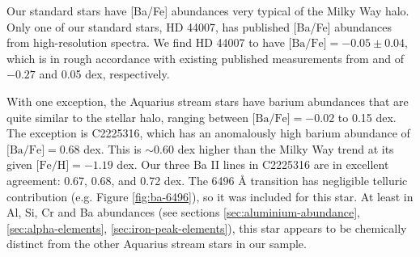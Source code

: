 \documentclass{emulateapj}
\begin{document}
Our standard stars have [Ba/Fe] abundances very typical of the Milky Way halo. Only one of our standard stars, HD 44007, has published [Ba/Fe] abundances from high-resolution spectra. We find HD 44007 to have $\mbox{[Ba/Fe]} = -0.05 \pm 0.04$, which is in rough accordance with existing published measurements from \citet{fulbright_2000} and \citet{burris;et-al_2000} of $-0.27$ and 0.05 dex, respectively. 

With one exception, the Aquarius stream stars have barium abundances that are quite similar to the stellar halo, ranging between $\mbox{[Ba/Fe]} = -0.02$ to 0.15 dex. The exception is C2225316, which has an anomalously high barium abundance of $\mbox{[Ba/Fe]} = 0.68$ dex. This is $\sim{}0.60$ dex higher than the Milky Way trend at its given $\mbox{[Fe/H]} = -1.19$ dex. Our three Ba \textsc{II} lines in C2225316 are in excellent agreement: 0.67, 0.68, and 0.72 dex. The 6496 {\AA} transition has negligible telluric contribution (e.g. Figure \ref{fig:ba-6496}), so it was included for this star. At least in Al, Si, Cr and Ba abundances (see sections \ref{sec:aluminium-abundance}, \ref{sec:alpha-elements}, \ref{sec:iron-peak-elements}), this star appears to be chemically distinct from the other Aquarius stream stars in our sample. 
\end{document}
